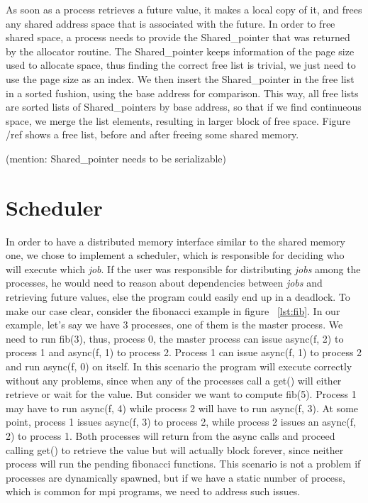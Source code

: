 As soon as a process retrieves a future value, it makes a local copy of it, and frees any shared address space
that is associated with the future.  In order to free shared space, a process needs to provide the Shared\_pointer
that was returned by the allocator routine.  The Shared\_pointer keeps information of the page size used to 
allocate space, thus finding the correct free list is trivial, we just need to use the page size as an index.
We then insert the Shared\_pointer in the free list in a sorted fushion, using the base address for comparison.
This way, all free lists are sorted lists of Shared\_pointers by base address, so that if we find continueous
space, we merge the list elements, resulting in larger block of free space.  Figure /ref shows a free list, before
and after freeing some shared memory.

(mention: Shared\_pointer needs to be serializable)

\label{scheduler}
\section{Scheduler}
In order to have a distributed memory interface similar to the shared memory one, we chose to implement 
a scheduler, which is responsible for deciding who will execute which \emph{job}.  If the user was 
responsible for distributing \emph{jobs} among the processes,  he would need to reason about dependencies
between \emph{jobs} and retrieving future values, else the program could easily end up in a deadlock.
To make our case clear, consider the fibonacci example in figure ~\ref{lst:fib}.  
In our example, let's say we have
3 processes, one of them is the master process.  We need to run fib(3), thus, process 0, the master process 
can issue async(f, 2) to process 1 and async(f, 1) to process 2.  Process 1 can issue async(f, 1) to 
process 2 and run async(f, 0) on itself.  In this scenario the program will execute correctly without any
problems, since when any of the processes call a get() will either retrieve or wait for the value.  But 
consider we want to compute fib(5).  Process 1 may have to run async(f, 4) while process 2 will have to run
async(f, 3).  At some point, process 1 issues async(f, 3) to process 2, while process 2 issues an async(f, 2)
to process 1.  Both processes will return from the async calls and proceed calling get() to retrieve the value
but will actually block forever, since neither process will run the pending fibonacci functions.  This scenario
is not a problem if processes are dynamically spawned, but if we have a static number of process, which is
common for mpi programs, we need to address such issues.  


